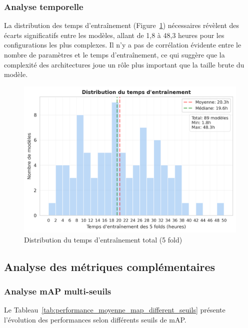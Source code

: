 \subsubsection{Analyse temporelle}

La distribution des temps d'entraînement (Figure~\ref{fig:ch4_11_training_time_dist_09}) nécessaires révèlent des écarts significatifs entre les modèles, allant de 1,8 à 48,3 heures pour les configurations les plus complexes. Il n'y a pas de corrélation évidente entre le nombre de paramètres et le temps d'entraînement, ce qui suggère que la complexité des architectures joue un rôle plus important que la taille brute du modèle.

\begin{figure}[H]
    \centering
    \includegraphics[width=1\textwidth]{02-main//figures/ch4/ch4_11_training_time_dist_09.png}
    \caption{Distribution du temps d'entraînement total (5 fold)}
    \label{fig:ch4_11_training_time_dist_09}
\end{figure}

\subsection{Analyse des métriques complémentaires}

\subsubsection{Analyse mAP multi-seuils}

Le Tableau~\ref{tab:performance_moyenne_map_different_seuils} présente l'évolution des performances selon différents seuils de mAP.

